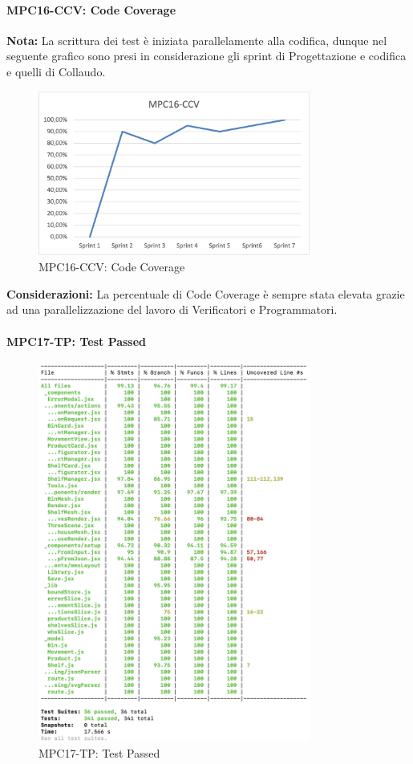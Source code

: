 \paragraph{MPC16-CCV: Code Coverage}
\textbf{Nota:} La scrittura dei test è iniziata parallelamente alla codifica, dunque nel seguente grafico sono presi in considerazione gli sprint di Progettazione e codifica e quelli di Collaudo.
\begin{figure}[h!] 
    \centering
    \includegraphics[width=0.8\textwidth]{images/MPC16-CCV.png}
    \caption{MPC16-CCV: Code Coverage}
\end{figure}

\noindent \textbf{Considerazioni:} La percentuale di Code Coverage è sempre stata elevata grazie ad una parallelizzazione del lavoro di Verificatori e Programmatori.

\paragraph{MPC17-TP: Test Passed}
\begin{figure}[H] 
    \centering
    \includegraphics[width=0.8\textwidth]{images/MPC17-TP.png}
    \caption{MPC17-TP: Test Passed}
\end{figure}

